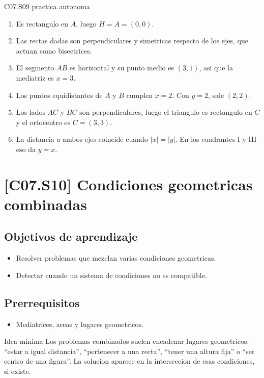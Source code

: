 \begin{fullsolution}{C07.S09 practica autonoma}
\begin{enumerate}[label=\textbf{PX-C07.S09-\arabic*:}, leftmargin=*]
  \item Es rectangulo en \(A\), luego \(H=A=(0,0)\).
  \item Las rectas dadas son perpendiculares y simetricas respecto de los ejes, que actuan como
  bisectrices.
  \item El segmento \(AB\) es horizontal y su punto medio es \((3,1)\), asi que la mediatriz es
  \(x=3\).
  \item Los puntos equidistantes de \(A\) y \(B\) cumplen \(x=2\). Con \(y=2\), sale \((2,2)\).
  \item Los lados \(AC\) y \(BC\) son perpendiculares, luego el triangulo es rectangulo en \(C\)
  y el ortocentro es \(C=(3,3)\).
  \item La distancia a ambos ejes coincide cuando \(|x|=|y|\). En los cuadrantes I y III eso da
  \(y=x\).
\end{enumerate}
\end{fullsolution}

\section{[C07.S10] Condiciones geometricas combinadas}

\subsection*{Objetivos de aprendizaje}
\begin{itemize}
  \item Resolver problemas que mezclan varias condiciones geometricas.
  \item Detectar cuando un sistema de condiciones no es compatible.
\end{itemize}

\subsection*{Prerrequisitos}
\begin{itemize}
  \item Mediatrices, areas y lugares geometricos.
\end{itemize}

\begin{theorybox}{Idea minima}
Los problemas combinados suelen encadenar lugares geometricos: ``estar a igual distancia'',
``pertenecer a una recta'', ``tener una altura fija'' o ``ser centro de una figura''. La
solucion aparece en la interseccion de esas condiciones, si existe.
\end{theorybox}

